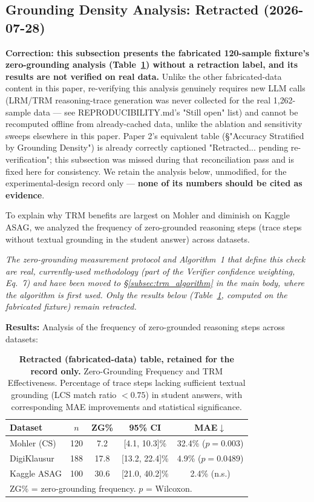 \documentclass[conference]{IEEEtran}
\begin{document}
\subsection{Grounding Density Analysis: Retracted (2026-07-28)}

\textbf{Correction: this subsection presents the fabricated 120-sample
fixture's zero-grounding analysis (Table~\ref{tab:grounding_density})
without a retraction label, and its results are not verified on real
data.} Unlike the other fabricated-data content in this paper,
re-verifying this analysis genuinely requires new LLM calls (LRM/TRM
reasoning-trace generation was never collected for the real 1{,}262-sample
data --- see REPRODUCIBILITY.md's "Still open" list) and cannot be
recomputed offline from already-cached data, unlike the ablation and
sensitivity sweeps elsewhere in this paper. Paper 2's equivalent table
(\S"Accuracy Stratified by Grounding Density") is already correctly
captioned "Retracted... pending re-verification"; this subsection was
missed during that reconciliation pass and is fixed here for
consistency. We retain the analysis below, unmodified, for the
experimental-design record only --- \textbf{none of its numbers should
be cited as evidence}.

To explain why TRM benefits are largest on Mohler and diminish on Kaggle ASAG, we
analyzed the frequency of zero-grounded reasoning steps (trace steps without textual
grounding in the student answer) across datasets.

\textit{The zero-grounding measurement protocol and Algorithm~1 that
define this check are real, currently-used methodology (part of the
Verifier confidence weighting, Eq.~7) and have been moved to
\S\ref{subsec:trm_algorithm} in the main body, where the algorithm is
first used. Only the results below (Table~\ref{tab:grounding_density},
computed on the fabricated fixture) remain retracted.}


\textbf{Results:} Analysis of the frequency of zero-grounded reasoning steps across
datasets:

\begin{table}[h]
\caption{\textbf{Retracted (fabricated-data) table, retained for the record only.}
         Zero-Grounding Frequency and TRM Effectiveness. Percentage of trace steps
         lacking sufficient textual grounding (LCS match ratio $< 0.75$) in student
         answers, with corresponding MAE improvements and statistical significance.}
\label{tab:grounding_density}
\centering
\footnotesize
\begin{tabular}{lcccc}
\toprule
\textbf{Dataset} & \textbf{$n$} & \textbf{ZG\%} & \textbf{95\% CI} &
\textbf{MAE$\downarrow$} \\
\midrule
Mohler (CS)  & 120 & 7.2  & [4.1, 10.3]\%  & 32.4\% ($p{=}0.003$) \\
DigiKlausur  & 188 & 17.8 & [13.2, 22.4]\% & 4.9\% ($p{=}0.0489$) \\
Kaggle ASAG  & 100 & 30.6 & [21.0, 40.2]\% & 2.4\% (n.s.) \\
\bottomrule
\multicolumn{5}{l}{ZG\% = zero-grounding frequency. $p$ = Wilcoxon.}
\end{tabular}
\end{table}
\end{document}
